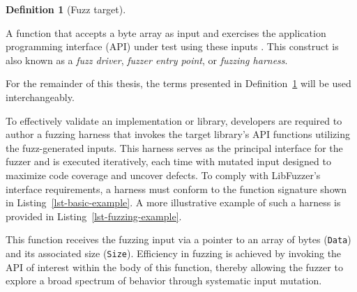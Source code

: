 \documentclass[
  a4paper,
]{scrreprt}
\newenvironment{Shaded}{\begin{snugshade}}{\end{snugshade}}
\newcommand{\ControlFlowTok}[1]{\textcolor[rgb]{0.85,0.12,0.09}{#1}}
\newcommand{\DataTypeTok}[1]{\textcolor[rgb]{0.47,0.16,0.63}{#1}}
\newcommand{\DecValTok}[1]{\textcolor[rgb]{0.47,0.16,0.63}{#1}}
\newcommand{\NormalTok}[1]{\textcolor[rgb]{0.33,0.33,0.33}{#1}}
\newcommand{\OperatorTok}[1]{\textcolor[rgb]{0.00,0.46,0.62}{#1}}
\theoremstyle{definition}
\newtheorem{definition}{Definition}[chapter]
\theoremstyle{remark}
\begin{document}
\begin{definition}[Fuzz
target]\protect\hypertarget{def-target}{}\label{def-target}

A function that accepts a byte array as input and exercises the
application programming interface (API) under test using these inputs
\autocite{libfuzzer}. This construct is also known as a \emph{fuzz
driver}, \emph{fuzzer entry point}, or \emph{fuzzing harness}.

\end{definition}

For the remainder of this thesis, the terms presented in
Definition~\ref{def-target} will be used interchangeably.

To effectively validate an implementation or library, developers are
required to author a fuzzing harness that invokes the target library's
API functions utilizing the fuzz-generated inputs. This harness serves
as the principal interface for the fuzzer and is executed iteratively,
each time with mutated input designed to maximize code coverage and
uncover defects. To comply with LibFuzzer's interface requirements, a
harness must conform to the function signature shown in
Listing~\ref{lst-basic-example}. A more illustrative example of such a
harness is provided in Listing~\ref{lst-fuzzing-example}.

\begin{codelisting}

\caption[Fuzzing harness format]{\label{lst-basic-example}This function
receives the fuzzing input via a pointer to an array of bytes
(\texttt{Data}) and its associated size (\texttt{Size}). Efficiency in
fuzzing is achieved by invoking the API of interest within the body of
this function, thereby allowing the fuzzer to explore a broad spectrum
of behavior through systematic input mutation.}

\centering{

\begin{Shaded}
\begin{Highlighting}[numbers=left,,]
\DataTypeTok{int}\NormalTok{ LLVMFuzzerTestOneInput}\OperatorTok{(}\DataTypeTok{const} \DataTypeTok{uint8\_t} \OperatorTok{*}\NormalTok{Data}\OperatorTok{,} \DataTypeTok{size\_t}\NormalTok{ Size}\OperatorTok{)} \OperatorTok{\{}
\NormalTok{  DoSomethingInterestingWithData}\OperatorTok{(}\NormalTok{Data}\OperatorTok{,}\NormalTok{ Size}\OperatorTok{);}
  \ControlFlowTok{return} \DecValTok{0}\OperatorTok{;}
\OperatorTok{\}}
\end{Highlighting}
\end{Shaded}

}

\end{codelisting}%
\end{document}
